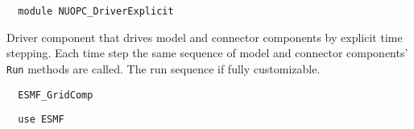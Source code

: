  
\setlength{\parskip}{0pt}
\setlength{\parindent}{0pt}
\setlength{\baselineskip}{11pt}
 
\def\bv{\begin{verbatim}}
\def\ev{\end{verbatim}}
\def\be{\begin{equation}}
\def\ee{\end{equation}}
\def\bea{\begin{eqnarray}}
\def\eea{\end{eqnarray}}
\def\bi{\begin{itemize}}
\def\ei{\end{itemize}}
\def\bn{\begin{enumerate}}
\def\en{\end{enumerate}}
\def\bd{\begin{description}}
\def\ed{\end{description}}
\def\({\left (}
\def\){\right )}
\def\[{\left [}
\def\]{\right ]}
\def\<{\left  \langle}
\def\>{\right \rangle}
\def\cI{{\cal I}}
\def\diag{\mathop{\rm diag}}
\def\tr{\mathop{\rm tr}}


\begin{verbatim}  module NUOPC_DriverExplicit
\end{verbatim}

Driver component that drives model and connector components by explicit time stepping. Each time step the same sequence of model and connector components' {\tt Run} methods are called. The run sequence if fully customizable.

\begin{verbatim}  ESMF_GridComp
\end{verbatim}

\begin{verbatim}  use ESMF
\end{verbatim}

